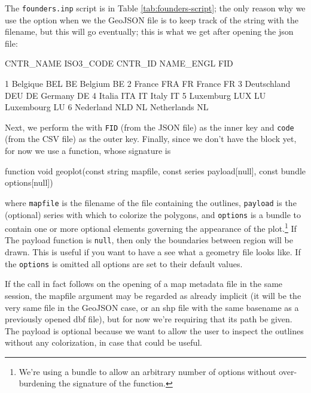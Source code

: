 \documentclass[a4paper]{article}
\begin{document}
The \texttt{founders.inp} script is in Table
\ref{tab:founders-script}; the only reason why we use the
 option when we  the GeoJSON file is to
keep track of the string with the filename, but this will go
eventually; this is what we get after opening the json file:
\begin{code}
     CNTR_NAME    ISO3_CODE      CNTR_ID    NAME_ENGL          FID

1     Belgique          BEL           BE      Belgium           BE
2       France          FRA           FR       France           FR
3  Deutschland          DEU           DE      Germany           DE
4       Italia          ITA           IT        Italy           IT
5    Luxemburg          LUX           LU   Luxembourg           LU
6    Nederland          NLD           NL  Netherlands           NL
\end{code}

Next, we perform the  with \texttt{FID} (from the JSON file)
as the inner key and \texttt{code} (from the CSV file) as the outer
key. Finally, since we don't have the  block yet, for now
we use a  function, whose signature is
\begin{code}
function void geoplot(const string mapfile,
	const series payload[null],
	const bundle options[null])
\end{code}
where \texttt{mapfile} is the filename of the file containing the
outlines, \texttt{payload} is the (optional) series with which to
colorize the polygons, and \texttt{options} is a bundle to contain one
or more optional elements governing the appearance of the
plot.\footnote{We're using a bundle to allow an arbitrary number of
  options without over-burdening the signature of the function.} If
The payload function is \texttt{null}, then only the boundaries
between region will be drawn. This is useful if you want to have a
see what a geometry file looks like. If the \texttt{options} is
omitted all options are set to their default values.

If the  call in fact follows on the opening of a map
metadata file in the same session, the mapfile argument may be
regarded as already implicit (it will be the very same file in the
GeoJSON case, or an shp file with the same basename as a previously
opened dbf file), but for now we're requiring that its path be
given. The payload is optional because we want to allow the user to
inspect the outlines without any colorization, in case that could be
useful.
\end{document}
